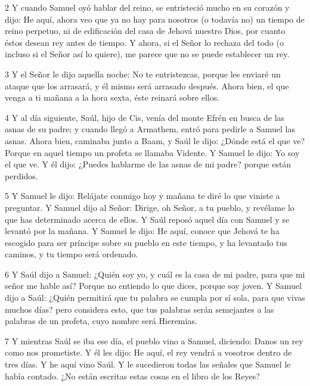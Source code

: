 \par 2 Y cuando Samuel oyó hablar del reino, se entristeció mucho en su corazón y dijo: He aquí, ahora veo que ya no hay para nosotros (o todavía no) un tiempo de reino perpetuo, ni de edificación del casa de Jehová nuestro Dios, por cuanto éstos desean rey antes de tiempo. Y ahora, si el Señor lo rechaza del todo (o incluso si el Señor así lo quiere), me parece que no se puede establecer un rey.

\par 3 Y el Señor le dijo aquella noche: No te entristezcas, porque les enviaré un ataque que los arrasará, y él mismo será arrasado después. Ahora bien, el que venga a ti mañana a la hora sexta, éste reinará sobre ellos.

\par 4 Y al día siguiente, Saúl, hijo de Cis, venía del monte Efrén en busca de las asnas de su padre; y cuando llegó a Armathem, entró para pedirle a Samuel las asnas. Ahora bien, caminaba junto a Baam, y Saúl le dijo: ¿Dónde está el que ve? Porque en aquel tiempo un profeta se llamaba Vidente. Y Samuel le dijo: Yo soy el que ve. Y él dijo: ¿Puedes hablarme de las asnas de mi padre? porque están perdidos.

\par 5 Y Samuel le dijo: Relájate conmigo hoy y mañana te diré lo que viniste a preguntar. Y Samuel dijo al Señor: Dirige, oh Señor, a tu pueblo, y revélame lo que has determinado acerca de ellos. Y Saúl reposó aquel día con Samuel y se levantó por la mañana. Y Samuel le dijo: He aquí, conoce que Jehová te ha escogido para ser príncipe sobre su pueblo en este tiempo, y ha levantado tus caminos, y tu tiempo será ordenado.

\par 6 Y Saúl dijo a Samuel: ¿Quién soy yo, y cuál es la casa de mi padre, para que mi señor me hable así? Porque no entiendo lo que dices, porque soy joven. Y Samuel dijo a Saúl: ¿Quién permitirá que tu palabra se cumpla por sí sola, para que vivas muchos días? pero considera esto, que tus palabras serán semejantes a las palabras de un profeta, cuyo nombre será Hieremias.

\par 7 Y mientras Saúl se iba ese día, el pueblo vino a Samuel, diciendo: Danos un rey como nos prometiste. Y él les dijo: He aquí, el rey vendrá a vosotros dentro de tres días. Y he aquí vino Saúl. Y le sucedieron todas las señales que Samuel le había contado. ¿No están escritas estas cosas en el libro de los Reyes?


